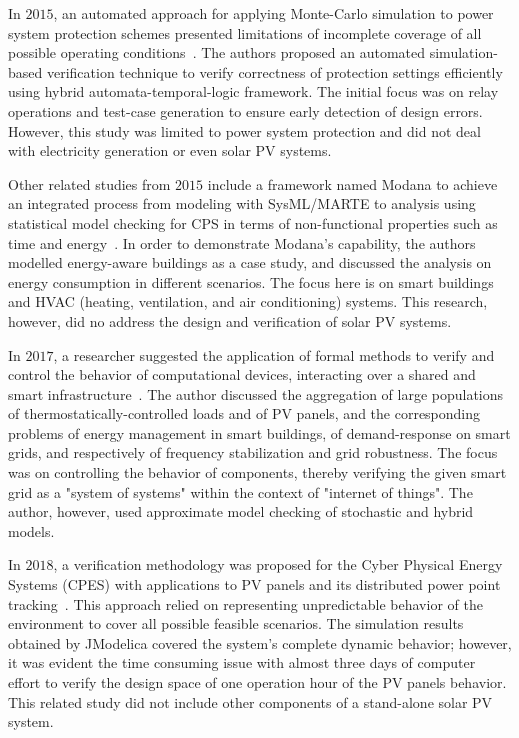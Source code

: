 In $2015$, an automated approach for applying Monte-Carlo simulation to power system protection schemes presented limitations of incomplete coverage of all possible operating conditions~\cite{Sengupta2015}. The authors proposed an automated simulation-based verification technique to verify correctness of protection settings efficiently using hybrid automata-temporal-logic framework. The initial focus was on relay operations and test-case generation to ensure early detection of design errors. However, this study was limited to power system protection and did not deal with electricity generation or even solar PV systems.

Other related studies from $2015$ include a framework named Modana to achieve an integrated process from modeling with SysML/MARTE to analysis using statistical model checking for CPS in terms of non-functional properties such as time and energy~\cite{Cheng2015}. In order to demonstrate Modana's capability, the authors modelled energy-aware buildings as a case study, and discussed the analysis on energy consumption in different scenarios. The focus here is on smart buildings and HVAC (heating, ventilation, and air conditioning) systems. This research, however, did no address the design and verification of solar PV systems. 
 
In $2017$, a researcher suggested the application of formal methods to verify and control the behavior of computational devices, interacting over a shared and smart infrastructure~\cite{Abate2017}. The author discussed the aggregation of large populations of thermostatically-controlled loads and of PV panels, and the corresponding problems of energy management in smart buildings, of demand-response on smart grids, and respectively of frequency stabilization and grid robustness. The focus was on controlling the behavior of components, thereby verifying the given smart grid as a "system of systems" within the context of "internet of things". The author, however, used approximate model checking of stochastic and hybrid models.

In $2018$, a verification methodology was proposed for the Cyber Physical Energy Systems (CPES) with applications to PV panels and its distributed power point tracking~\cite{Driouich2018}. This approach relied on representing unpredictable behavior of the environment to cover all possible feasible scenarios. The simulation results obtained by JModelica covered the system's complete dynamic behavior; however, it was evident the time consuming issue with almost three days of computer effort to verify the design space of one operation hour of the PV panels behavior. This related study did not include other components of a stand-alone solar PV system.

